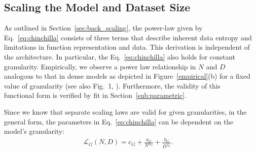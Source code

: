 \subsection{Scaling the Model and Dataset Size}
\label{sec:scaling_model_data}
As outlined in Section~\ref{sec:back_scaling}, the power-law given by Eq.~\ref{eq:chinchilla} consists of three terms that describe inherent data entropy and limitations in function representation and data. This derivation is independent of the architecture. In particular, the Eq.~\ref{eq:chinchilla} also holds for constant granularity. Empirically, we observe a power law relationship in $N$ and $D$ analogous to that in dense models as depicted in Figure~\ref{empirical}(b) for a fixed value of granularity (see also Fig.~1, \cite{kaplan2020scaling}).  Furthermore, the validity of this functional form is verified by fit in Section~\ref{sub:parametric}. 

Since we know that separate scaling laws are valid for given granularities, in the general form, the parameters in Eq.~\ref{eq:chinchilla} can be dependent on the model's granularity:
\begin{align}\label{eq:gran_func}
     \mathcal{L}_G(N, D) = c_G + \frac{a_G}{N^{\alpha_G}} + \frac{b_G}{D^{\beta_G}}.
\end{align}




